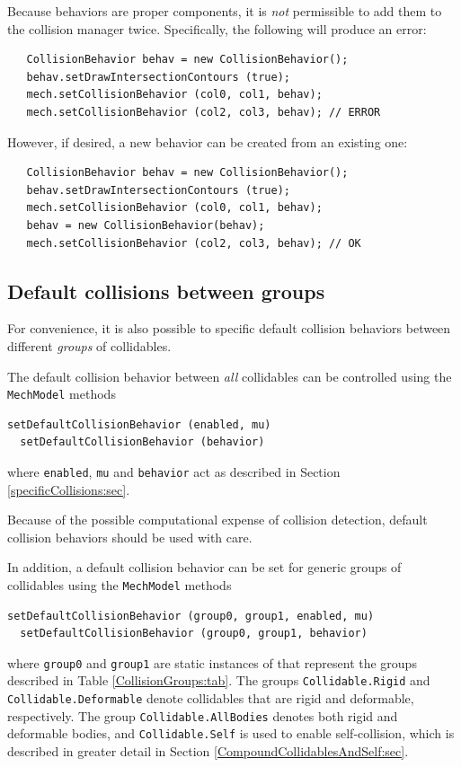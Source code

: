 \begin{sideblock}
Because behaviors are proper components, it is {\it not} permissible
to add them to the collision manager twice. Specifically, the
following will produce an error:
\begin{verbatim}
   CollisionBehavior behav = new CollisionBehavior();
   behav.setDrawIntersectionContours (true); 
   mech.setCollisionBehavior (col0, col1, behav);
   mech.setCollisionBehavior (col2, col3, behav); // ERROR
\end{verbatim}
However, if desired, a new behavior can be created from an existing
one:
\begin{verbatim}
   CollisionBehavior behav = new CollisionBehavior();
   behav.setDrawIntersectionContours (true); 
   mech.setCollisionBehavior (col0, col1, behav);
   behav = new CollisionBehavior(behav);
   mech.setCollisionBehavior (col2, col3, behav); // OK
\end{verbatim}
\end{sideblock}

\subsection{Default collisions between groups}

For convenience, it is also possible to specific default collision
behaviors between different {\it groups} of collidables.

The default collision behavior between {\it all} collidables can
be controlled using the {\tt MechModel} methods
%
\begin{lstlisting}[]
  setDefaultCollisionBehavior (enabled, mu)
  setDefaultCollisionBehavior (behavior)
\end{lstlisting}
%
where {\tt enabled}, {\tt mu} and {\tt behavior} act as described in
Section \ref{specificCollisions:sec}.

\begin{sideblock} 
Because of the possible computational expense of collision detection,
default collision behaviors should be used with care.
\end{sideblock} 

In addition, a default collision behavior can be set for generic
groups of collidables using the {\tt MechModel} methods
%
\begin{lstlisting}[]
  setDefaultCollisionBehavior (group0, group1, enabled, mu)
  setDefaultCollisionBehavior (group0, group1, behavior)
\end{lstlisting}
%
where {\tt group0} and {\tt group1} are static instances of
 that
represent the groups described in Table \ref{CollisionGroups:tab}.
The groups {\tt Collidable.Rigid} and {\tt Collidable.Deformable}
denote collidables that are rigid and deformable, respectively.  The
group {\tt Collidable.AllBodies} denotes both rigid and deformable
bodies, and {\tt Collidable.Self} is used to enable self-collision,
which is described in greater detail in Section
\ref{CompoundCollidablesAndSelf:sec}.

